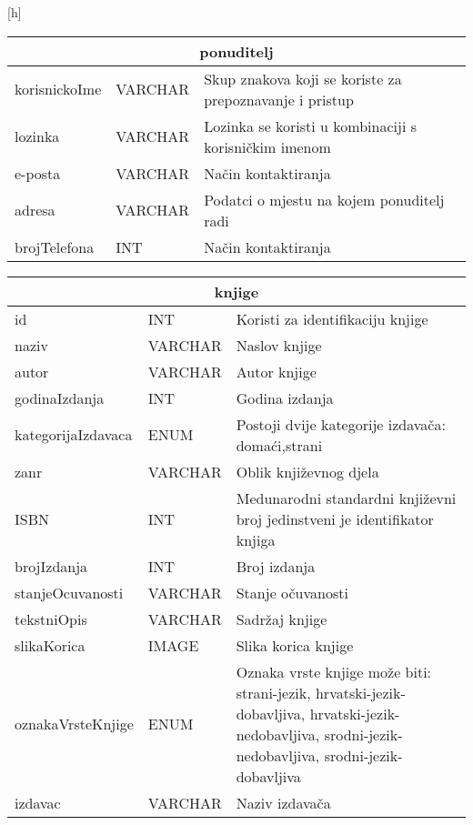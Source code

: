 \documentclass{article}
\begin{document}
[h]
	\centering
	\vspace{1cm}
	\begin{tabular}{ |p{4cm}|p{3cm}|p{5cm}|  }
		\hline
		\multicolumn{3}{|c|}{\textbf{ponuditelj}} \\
		\bottomrule[2pt]
		\cellcolor{green!25}korisnickoIme & VARCHAR &Skup znakova koji se koriste za prepoznavanje i pristup\\
		\hline
		lozinka & VARCHAR & Lozinka se koristi u kombinaciji s korisničkim imenom\\
		\hline
		e-posta & VARCHAR & Način kontaktiranja\\
		\hline
		adresa & VARCHAR & Podatci o mjestu na kojem ponuditelj radi\\
		\hline
		brojTelefona & INT & Način kontaktiranja\\
		\hline
	\end{tabular}
	\vspace{1cm}
	\begin{tabular}{ |p{4cm}|p{3cm}|p{5cm}|  }
		\hline
		\multicolumn{3}{|c|}{\textbf{knjige}} \\
		\bottomrule[2pt]
		\cellcolor{green!25}id & INT &Koristi za identifikaciju knjige\\
		\hline
		naziv & VARCHAR & Naslov knjige\\
		\hline
		autor & VARCHAR & Autor knjige\\
		\hline
		godinaIzdanja & INT & Godina izdanja\\
		\hline
		kategorijaIzdavaca & ENUM & Postoji dvije kategorije izdavača: domaći,strani\\
		\hline
		zanr & VARCHAR & Oblik književnog djela\\
		\hline
		ISBN & INT & Medunarodni standardni književni broj jedinstveni je identifikator knjiga\\
		\hline
		brojIzdanja & INT & Broj izdanja\\
		\hline
		stanjeOcuvanosti & VARCHAR & Stanje očuvanosti\\
		\hline
		tekstniOpis & VARCHAR & Sadržaj knjige\\
		\hline
		slikaKorica & IMAGE & Slika korica knjige\\
		\hline
		oznakaVrsteKnjige & ENUM & Oznaka vrste knjige može biti: strani-jezik, hrvatski-jezik-dobavljiva, hrvatski-jezik-nedobavljiva, srodni-jezik-nedobavljiva, srodni-jezik-dobavljiva\\
		\hline
		izdavac & VARCHAR & Naziv izdavača\\
		\hline
	\end{tabular}
\end{document}
